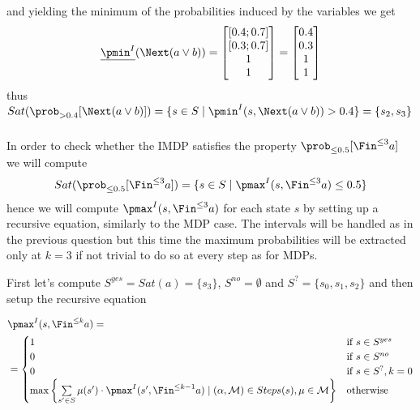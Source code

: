 and yielding the minimum of the probabilities induced by the variables we get
\[
	\underline{\pmin^I}(\Next (a \vee b)) =
	\begin{bmatrix} [0.4;0.7] \\ [0.3;0.7] \\ 1 \\ 1 \end{bmatrix} =
	\begin{bmatrix} 0.4 \\ 0.3 \\ 1 \\ 1 \end{bmatrix}
\]
thus $Sat(\prob_{>0.4}[\Next(a \vee b)]) = \{s \in S \mid \pmin^I(s, \Next(a \vee b)) > 0.4 \} = \{ s_2, s_3 \}$

\subsubsection{}

In order to check whether the IMDP satisfies the property
$\prob_{\le 0.5}[\Fin^{\le 3} a ]$ we will compute
\[
	Sat(\prob_{\le 0.5}[\Fin^{\le 3} a]) = \{ s \in S \mid \pmax^I(s, \Fin^{\le 3} a) \le 0.5 \}
\]
hence we will compute $\pmax^I(s, \Fin^{\le 3} a)$ for each state $s$ by
setting up a recursive equation, similarly to the MDP case.
The intervals will be handled as in the previous question but this time the
maximum probabilities will be extracted only at $k = 3$ if not trivial to do so
at every step as for MDPs.

First let's compute $S^{yes} = Sat(a) = \{ s_3 \}$, $S^{no} = \emptyset$ and
$S^? = \{ s_0, s_1, s_2 \}$ and then setup the recursive equation

\begin{align*}
	 & \pmax^I(s, \Fin^{\le k} a) = \\
	 & =
	\begin{cases}
		1                                                                                                                                                   & \text{if } s \in S^{yes}    \\
		0                                                                                                                                                   & \text{if } s \in S^{no}     \\
		0                                                                                                                                                   & \text{if } s \in S^?, k = 0 \\
		\max \left\{ \sum\limits_{s' \in S} \mu(s')\cdot\pmax^I(s', \Fin^{\le k-1} a) \mid (\alpha, \mathcal{M}) \in Steps(s), \mu \in \mathcal{M} \right\} & \text{otherwise}
	\end{cases}
\end{align*}

